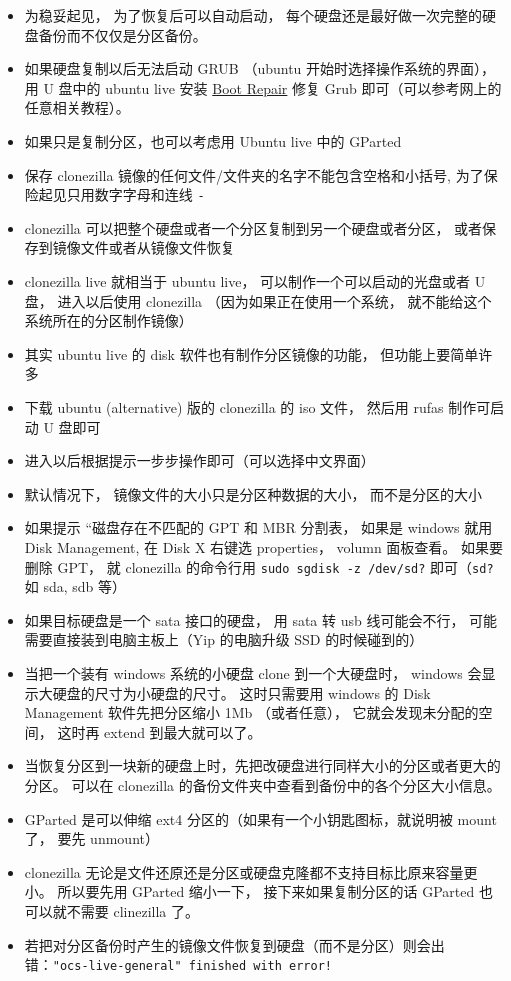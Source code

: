 \begin{itemize}
\item 为稳妥起见， 为了恢复后可以自动启动， 每个硬盘还是最好做一次完整的硬盘备份而不仅仅是分区备份。
\item 如果硬盘复制以后无法启动 GRUB （ubuntu 开始时选择操作系统的界面）， 用 U 盘中的 ubuntu live 安装 \href{https://help.ubuntu.com/community/Boot-Repair}{Boot Repair} 修复 Grub 即可（可以参考网上的任意相关教程）。
\item 如果只是复制分区，也可以考虑用 Ubuntu live 中的 GParted
\item 保存 clonezilla 镜像的任何文件/文件夹的名字不能包含空格和小括号, 为了保险起见只用数字字母和连线 \verb`-`
\item clonezilla 可以把整个硬盘或者一个分区复制到另一个硬盘或者分区， 或者保存到镜像文件或者从镜像文件恢复
\item clonezilla live 就相当于 ubuntu live， 可以制作一个可以启动的光盘或者 U 盘， 进入以后使用 clonezilla （因为如果正在使用一个系统， 就不能给这个系统所在的分区制作镜像）
\item 其实 ubuntu live 的 disk 软件也有制作分区镜像的功能， 但功能上要简单许多

\item 下载 ubuntu (alternative) 版的 clonezilla 的 iso 文件， 然后用 rufas 制作可启动 U 盘即可
\item 进入以后根据提示一步步操作即可（可以选择中文界面）
\item 默认情况下， 镜像文件的大小只是分区种数据的大小， 而不是分区的大小

\item 如果提示 “磁盘存在不匹配的 GPT 和 MBR 分割表， 如果是 windows 就用 Disk Management, 在 Disk X 右键选 properties， volumn 面板查看。 如果要删除 GPT， 就 clonezilla 的命令行用 \verb|sudo sgdisk -z /dev/sd?| 即可（\verb|sd?| 如 sda, sdb 等）
\item 如果目标硬盘是一个 sata 接口的硬盘， 用 sata 转 usb 线可能会不行， 可能需要直接装到电脑主板上（Yip 的电脑升级 SSD 的时候碰到的）
\item 当把一个装有 windows 系统的小硬盘 clone 到一个大硬盘时， windows 会显示大硬盘的尺寸为小硬盘的尺寸。 这时只需要用 windows 的 Disk Management 软件先把分区缩小 1Mb （或者任意）， 它就会发现未分配的空间， 这时再 extend 到最大就可以了。
\item 当恢复分区到一块新的硬盘上时，先把改硬盘进行同样大小的分区或者更大的分区。 可以在 clonezilla 的备份文件夹中查看到备份中的各个分区大小信息。
\end{itemize}

\begin{itemize}
\item GParted 是可以伸缩 ext4 分区的（如果有一个小钥匙图标，就说明被 mount 了， 要先 unmount）
\item clonezilla 无论是文件还原还是分区或硬盘克隆都不支持目标比原来容量更小。 所以要先用 GParted 缩小一下， 接下来如果复制分区的话 GParted 也可以就不需要 clinezilla 了。
\item 若把对分区备份时产生的镜像文件恢复到硬盘（而不是分区）则会出错：\verb`"ocs-live-general" finished with error!`
\end{itemize}
